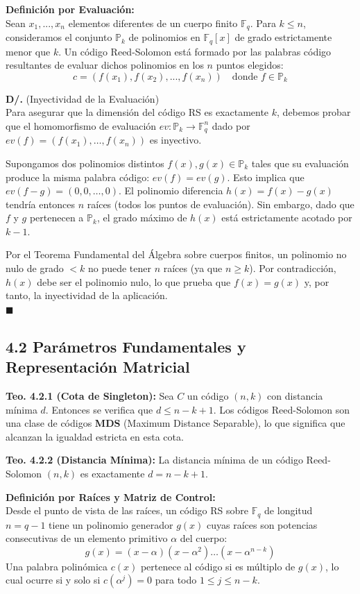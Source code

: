 \documentclass{article}
\begin{document}
\textbf{Definición por Evaluación:}\\
Sean $x_{1},...,x_{n}$ elementos diferentes de un cuerpo finito $\mathbb{F}_{q}$. Para $k \le n$, consideramos el conjunto $\mathbb{P}_{k}$ de polinomios en $\mathbb{F}_{q}[x]$ de grado estrictamente menor que $k$. Un código Reed-Solomon está formado por las palabras código resultantes de evaluar dichos polinomios en los $n$ puntos elegidos:
\[ c = (f(x_{1}),f(x_{2}),...,f(x_{n})) \quad \text{donde } f \in \mathbb{P}_{k} \]


\noindent\textbf{D/. }(Inyectividad de la Evaluación)\\
Para asegurar que la dimensión del código RS es exactamente $k$, debemos probar que el homomorfismo de evaluación $ev: \mathbb{P}_k \to \mathbb{F}_q^n$ dado por $ev(f) = (f(x_1), \dots, f(x_n))$ es inyectivo.

Supongamos dos polinomios distintos $f(x), g(x) \in \mathbb{P}_k$ tales que su evaluación produce la misma palabra código: $ev(f) = ev(g)$. Esto implica que $ev(f - g) = (0, 0, \dots, 0)$. El polinomio diferencia $h(x) = f(x) - g(x)$ tendría entonces $n$ raíces (todos los puntos de evaluación). Sin embargo, dado que $f$ y $g$ pertenecen a $\mathbb{P}_k$, el grado máximo de $h(x)$ está estrictamente acotado por $k-1$. 

Por el Teorema Fundamental del Álgebra sobre cuerpos finitos, un polinomio no nulo de grado $< k$ no puede tener $n$ raíces (ya que $n \ge k$). Por contradicción, $h(x)$ debe ser el polinomio nulo, lo que prueba que $f(x) = g(x)$ y, por tanto, la inyectividad de la aplicación. \\
 \noindent$\blacksquare$

\subsection{4.2 Parámetros Fundamentales y Representación Matricial}

\textbf{Teo. 4.2.1 (Cota de Singleton):} Sea $C$ un código $(n,k)$ con distancia mínima $d$. Entonces se verifica que $d \le n-k+1$. Los códigos Reed-Solomon son una clase de códigos \textbf{MDS} (Maximum Distance Separable), lo que significa que alcanzan la igualdad estricta en esta cota.

\textbf{Teo. 4.2.2 (Distancia Mínima):} La distancia mínima de un código Reed-Solomon $(n,k)$ es exactamente $d = n-k+1$.

\textbf{Definición por Raíces y Matriz de Control:}\\
Desde el punto de vista de las raíces, un código RS sobre $\mathbb{F}_q$ de longitud $n=q-1$ tiene un polinomio generador $g(x)$ cuyas raíces son potencias consecutivas de un elemento primitivo $\alpha$ del cuerpo:
\[ g(x) = (x-\alpha)(x-\alpha^2)\dots(x-\alpha^{n-k}) \]
Una palabra polinómica $c(x)$ pertenece al código si es múltiplo de $g(x)$, lo cual ocurre si y solo si $c(\alpha^j) = 0$ para todo $1 \le j \le n-k$.
\end{document}
